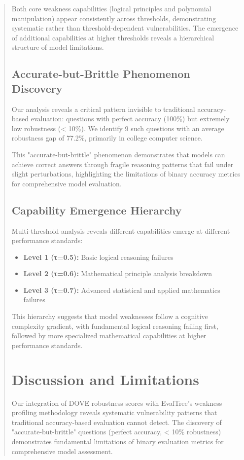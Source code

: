 \documentclass[11pt]{article}
\begin{document}
\begin{abstract}
Both core weakness capabilities (logical principles and polynomial manipulation) appear consistently across thresholds, demonstrating systematic rather than threshold-dependent vulnerabilities. The emergence of additional capabilities at higher thresholds reveals a hierarchical structure of model limitations.

\subsection{Accurate-but-Brittle Phenomenon Discovery}

Our analysis reveals a critical pattern invisible to traditional accuracy-based evaluation: questions with perfect accuracy (100\%) but extremely low robustness (< 10\%). We identify 9 such questions with an average robustness gap of 77.2\%, primarily in college computer science.

This "accurate-but-brittle" phenomenon demonstrates that models can achieve correct answers through fragile reasoning patterns that fail under slight perturbations, highlighting the limitations of binary accuracy metrics for comprehensive model evaluation.

\subsection{Capability Emergence Hierarchy}

Multi-threshold analysis reveals different capabilities emerge at different performance standards:
\begin{itemize}
    \item \textbf{Level 1 (τ=0.5):} Basic logical reasoning failures
    \item \textbf{Level 2 (τ=0.6):} Mathematical principle analysis breakdown  
    \item \textbf{Level 3 (τ=0.7):} Advanced statistical and applied mathematics failures
\end{itemize}

This hierarchy suggests that model weaknesses follow a cognitive complexity gradient, with fundamental logical reasoning failing first, followed by more specialized mathematical capabilities at higher performance standards.

\section{Discussion and Limitations}

Our integration of DOVE robustness scores with EvalTree's weakness profiling methodology reveals systematic vulnerability patterns that traditional accuracy-based evaluation cannot detect. The discovery of "accurate-but-brittle" questions (perfect accuracy, < 10\% robustness) demonstrates fundamental limitations of binary evaluation metrics for comprehensive model assessment.


\end{abstract}
\end{document}
